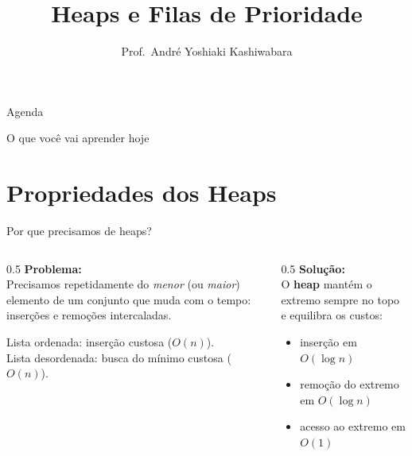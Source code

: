 \documentclass[aspectratio=169]{beamer}
\title{Heaps e Filas de Prioridade}
\author{Prof.\ André Yoshiaki Kashiwabara}
\institute{DCOMP -- Universidade Federal de Sergipe\\
\texttt{andreyoshiaki@dcomp.ufs.br}}
\date{}
\begin{document}
\begin{frame}[plain]
  \titlepage
\end{frame}

\begin{frame}{Agenda}
  \tableofcontents
\end{frame}

\begin{frame}{O que você vai aprender hoje}
  \begin{center}
  \end{center}
\end{frame}

\section{Propriedades dos Heaps}

\begin{frame}{Por que precisamos de heaps?}
  \begin{columns}[T]
    \begin{column}{0.5\textwidth}
      \textbf{Problema:}\\[0.3em]
      Precisamos repetidamente do \emph{menor} (ou \emph{maior}) elemento de um
      conjunto que muda com o tempo: inserções e remoções intercaladas.

      \medskip
      Lista ordenada: inserção custosa ($O(n)$).\\
      Lista desordenada: busca do mínimo custosa ($O(n)$).
    \end{column}
    \begin{column}{0.5\textwidth}
      \textbf{Solução:}\\[0.3em]
      O \textbf{heap} mantém o extremo sempre no topo e equilibra os custos:
      \begin{itemize}
        \item inserção em $O(\log n)$
        \item remoção do extremo em $O(\log n)$
        \item acesso ao extremo em $O(1)$
      \end{itemize}
    \end{column}
  \end{columns}
\end{frame}
\end{document}
